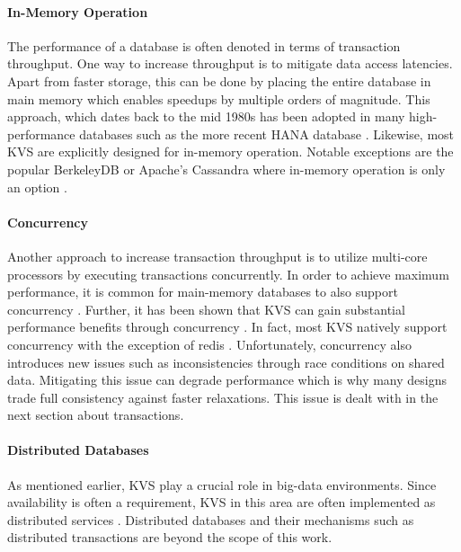 \paragraph{In-Memory Operation}

The performance of a database is often denoted in terms of transaction
throughput. One way to increase throughput is to mitigate data access latencies.
Apart from faster storage, this can be done by placing the entire database in
main memory which enables speedups by multiple orders of magnitude. This
approach, which dates back to the mid 1980s has been adopted in many
high-performance databases such as the more recent HANA database
\cite{molina1992main, faerber2012hana}. Likewise, most KVS are explicitly
designed for in-memory operation. Notable exceptions are the popular BerkeleyDB
or Apache's Cassandra where in-memory operation is only an option
\cite{bdb2017doc, lakshman2010cassandra}.

\paragraph{Concurrency}

Another approach to increase transaction throughput is to utilize multi-core
processors by executing transactions concurrently. In order to achieve maximum
performance, it is common for main-memory databases to also support concurrency
\cite{grund2010hyrise, faerber2012hana, diaconu2013hekaton}. Further, it has
been shown that KVS can gain substantial performance benefits through
concurrency \cite{fan2013memc3, li2015architecting, xu2014building}. In fact,
most KVS natively support concurrency with the exception of redis \cite{?}.
Unfortunately, concurrency also introduces new issues such as inconsistencies
through race conditions on shared data. Mitigating this issue can degrade
performance which is why many designs trade full consistency against faster
relaxations. This issue is dealt with in the next section about transactions.

\paragraph{Distributed Databases}

As mentioned earlier, KVS play a crucial role in big-data environments. Since
availability is often a requirement, KVS in this area are often implemented as
distributed services \cite{chang2008bigtable, decandia2007dynamo,
lakshman2010cassandra, wang2015hydradb}. Distributed databases and their
mechanisms such as distributed transactions are beyond the scope of this work.


